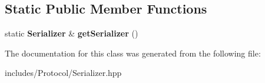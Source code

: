 \subsection*{Static Public Member Functions}
\begin{DoxyCompactItemize}
\item 
\mbox{\label{classspider_1_1_serializer_aaadf4a402a583583667757408d60d4d7}} 
static \textbf{ Serializer} \& {\bfseries get\+Serializer} ()
\end{DoxyCompactItemize}


The documentation for this class was generated from the following file\+:\begin{DoxyCompactItemize}
\item 
includes/\+Protocol/Serializer.\+hpp\end{DoxyCompactItemize}
